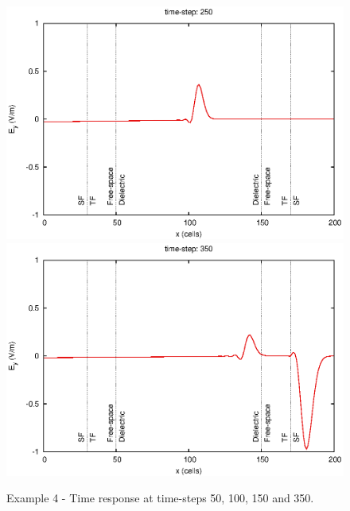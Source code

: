 \documentclass[onecolumn,a4paper]{article}
\numberwithin{equation}{section}
\begin{document}
\begin{figure}[ht!]
\begin{center}
  \includegraphics[width=0.49\linewidth]{figures/parplate1D_dielslab-frame000250}
  \includegraphics[width=0.49\linewidth]{figures/parplate1D_dielslab-frame000350}
  \caption{\label{fg:parplate1D_dielslab_td} Example 4 - Time response at time-steps 50, 100, 150 and 350.} 
\end{center}
\end{figure}
\end{document}
